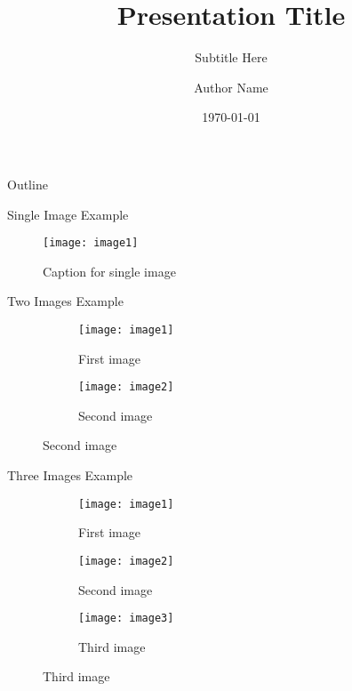 \documentclass{beamer}
\title{Presentation Title}
\subtitle{Subtitle Here}
\author{Author Name}
\institute{Institute Name}
\date{\today}
\begin{document}
\begin{frame}
\titlepage
\end{frame}

\begin{frame}{Outline}
\tableofcontents
\end{frame}

\begin{frame}{Single Image Example}
\begin{figure}[h]
\centering
\texttt{[image: image1]}
\caption{Caption for single image}
\end{figure}
\end{frame}

\begin{frame}{Two Images Example}
\begin{figure}[h]
\centering
\begin{subfigure}{0.45\textwidth}
\texttt{[image: image1]}
\caption{First image}
\end{subfigure}
\hfill
\begin{subfigure}{0.45\textwidth}
\texttt{[image: image2]}
\caption{Second image}
\end{subfigure}
\end{figure}
\end{frame}

\begin{frame}{Three Images Example}
\begin{figure}[h]
\centering
\begin{subfigure}{0.3\textwidth}
\texttt{[image: image1]}
\caption{First image}
\end{subfigure}
\hfill
\begin{subfigure}{0.3\textwidth}
\texttt{[image: image2]}
\caption{Second image}
\end{subfigure}
\hfill
\begin{subfigure}{0.3\textwidth}
\texttt{[image: image3]}
\caption{Third image}
\end{subfigure}
\end{figure}
\end{frame}
\end{document}
